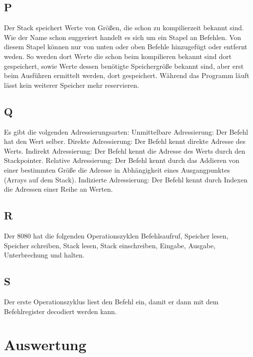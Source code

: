 \documentclass[10pt]{article}
\begin{document}
\begin{multicols}{2}
	\subsection*{P}
	Der Stack speichert Werte von Größen, die schon zu kompilierzeit bekannt sind. Wie der Name schon suggeriert handelt es sich um ein Stapel an Befehlen. Von diesem Stapel können nur von unten oder oben Befehle hinzugefügt oder entfernt weden. So werden dort Werte die schon beim kompilieren bekannt sind dort gespeichert, sowie Werte dessen benötigte Speichergröße bekannt sind, aber erst beim Ausführen ermittelt werden, dort gespeichert. Während das Programm läuft lässt kein weiterer Speicher mehr reservieren.
	\subsection*{Q}
	Es gibt die volgenden Adressierungsarten:
	Unmittelbare Adressierung: Der Befehl hat den Wert selber.
	Direkte Adressierung: Der Befehl kennt direkte Adresse des Werts.
	Indirekt Adressierung: Der Befehl kennt die Adresse des Werts durch den Stackpointer.
	Relative Adressierung: Der Befehl kennt durch das Addieren von einer bestimmten Größe die Adresse in Abhängigkeit eines Ausgangpunktes (Arrays auf dem Stack).
	Indizierte Adressierung: Der Befehl kennt durch Indexen die Adressen einer Reihe an Werten.
	\subsection*{R}
	Der 8080 hat die folgenden Operationszyklen Befehlsaufruf, Speicher lesen, Speicher schreiben, Stack lesen, Stack einschreiben, Eingabe, Ausgabe, Unterbrechung und halten.
	\subsection*{S}
	Der erste Operationszyklus liest den Befehl ein, damit er dann mit dem Befehlregister decodiert werden kann.



	\section{Auswertung}

\end{multicols}
\end{document}

